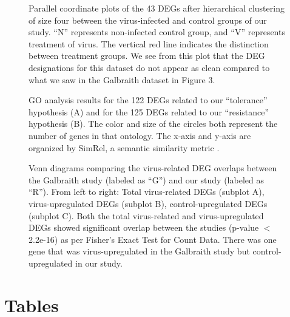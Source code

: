 \documentclass{bmcart}
\begin{document}
\begin{linenumbers}
\begin{backmatter}
\begin{figure}[h!]
\caption{
Parallel coordinate plots of the 43 DEGs after hierarchical clustering of size four between the virus-infected and control groups of our study. ``N'' represents non-infected control group, and ``V'' represents treatment of virus. The vertical red line indicates the distinction between treatment groups. We see from this plot that the DEG designations for this dataset do not appear as clean compared to what we saw in the Galbraith dataset in Figure 3.}
\end{figure}

\begin{figure}[h!]
\caption{
GO analysis results for the 122 DEGs related to our ``tolerance'' hypothesis (A) and for the 125 DEGs related to our ``resistance'' hypothesis (B). The color and size of the circles both represent the number of genes in that ontology. The x-axis and y-axis are organized by SimRel, a semantic similarity metric \cite{semantic}.}
\end{figure}

\begin{figure}[h!]
\caption{
Venn diagrams comparing the virus-related DEG overlaps between the Galbraith study (labeled as ``G'') and our study (labeled as ``R''). From left to right: Total virus-related DEGs (subplot A), virus-upregulated DEGs (subplot B), control-upregulated DEGs (subplot C). Both the total virus-related and virus-upregulated DEGs showed significant overlap between the studies (p-value $<$ 2.2e-16) as per Fisher's Exact Test for Count Data. There was one gene that was virus-upregulated in the Galbraith study but control-upregulated in our study.}
\end{figure}

\newpage
\section*{Tables}


\end{backmatter}
\end{linenumbers}
\end{document}
